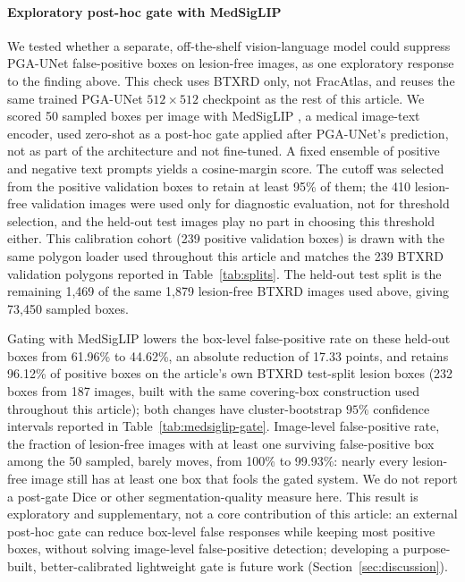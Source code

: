 \paragraph{Exploratory post-hoc gate with MedSigLIP}
We tested whether a separate, off-the-shelf vision-language model could suppress PGA-UNet false-positive boxes on lesion-free images, as one exploratory response to the finding above. This check uses BTXRD only, not FracAtlas, and reuses the same trained PGA-UNet $512\times512$ checkpoint as the rest of this article. We scored 50 sampled boxes per image with MedSigLIP \cite{b18}, a medical image-text encoder, used zero-shot as a post-hoc gate applied after PGA-UNet's prediction, not as part of the architecture and not fine-tuned. A fixed ensemble of positive and negative text prompts yields a cosine-margin score. The cutoff was selected from the positive validation boxes to retain at least 95\% of them; the 410 lesion-free validation images were used only for diagnostic evaluation, not for threshold selection, and the held-out test images play no part in choosing this threshold either. This calibration cohort (239 positive validation boxes) is drawn with the same polygon loader used throughout this article and matches the 239 BTXRD validation polygons reported in Table~\ref{tab:splits}. The held-out test split is the remaining 1{,}469 of the same 1{,}879 lesion-free BTXRD images used above, giving 73{,}450 sampled boxes.

Gating with MedSigLIP lowers the box-level false-positive rate on these held-out boxes from 61.96\% to 44.62\%, an absolute reduction of 17.33 points, and retains 96.12\% of positive boxes on the article's own BTXRD test-split lesion boxes (232 boxes from 187 images, built with the same covering-box construction used throughout this article); both changes have cluster-bootstrap $95\%$ confidence intervals reported in Table~\ref{tab:medsiglip-gate}. Image-level false-positive rate, the fraction of lesion-free images with at least one surviving false-positive box among the 50 sampled, barely moves, from 100\% to 99.93\%: nearly every lesion-free image still has at least one box that fools the gated system. We do not report a post-gate Dice or other segmentation-quality measure here. This result is exploratory and supplementary, not a core contribution of this article: an external post-hoc gate can reduce box-level false responses while keeping most positive boxes, without solving image-level false-positive detection; developing a purpose-built, better-calibrated lightweight gate is future work (Section~\ref{sec:discussion}).


